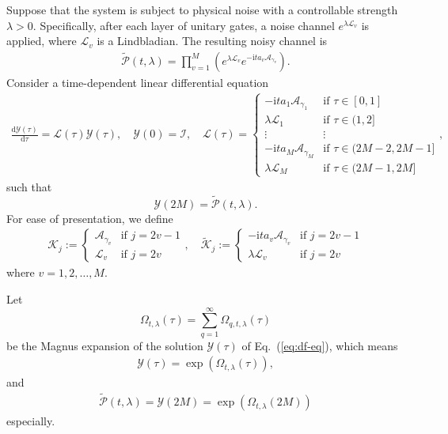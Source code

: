 \documentclass[11pt]{article}
\newcommand{\eq}[1]{(\ref{eq:#1})}
\renewcommand{\i}{\mathrm{i}}
\renewcommand{\d}{\mathrm{d}}
\renewcommand{\P}{\mathcal{P}}
\newcommand{\A}{\mathcal{A}}
\newcommand{\mc}{\mathcal}
\begin{document}
Suppose that the system is subject to physical noise with a controllable strength $\lambda>0$. Specifically, after each layer of unitary gates, a noise channel $e^{\lambda \mc L_{v}}$ is applied, where $\mc L_{v}$ is a Lindbladian. The resulting noisy channel is
\begin{align*}
    \tilde{\P}(t,\lambda)=\prod_{v=1}^M\left( e^{\lambda \mc L_{v}} e^{-\i t a_{v} \A_{\gamma_v}} \right).
\end{align*}
Consider a time-dependent linear differential equation \begin{align}
   \frac{\d \mc Y(\tau)}{\d \tau} = \mc L(\tau) \mc Y(\tau), \quad \mc Y(0)= \mc I, \quad \mc L(\tau) = \begin{cases} -\i t a_1 \A_{\gamma_1} & \text{if } \tau \in [0, 1] \\ \lambda \mc L_1 & \text{if } \tau \in (1, 2] \\ \vdots & \vdots \\ -\i t a_M \A_{\gamma_M} & \text{if } \tau \in (2M-2, 2M-1] \\ \lambda \mc L_M & \text{if } \tau \in (2M-1, 2M] \end{cases}, \label{eq:df-eq}
\end{align}
such that \[
\mc Y(2M) = \tilde{\mc P}(t, \lambda).
\]
For ease of presentation, we define \begin{align}
    \mathcal{K}_j := \begin{cases}\mathcal{A}_{\gamma_v} & \text{if } j = 2v-1\\ \mathcal{L}_v & \text{if } j = 2v \end{cases}, \quad \tilde{\mathcal{K}}_j := \begin{cases}-\i ta_{v}\mathcal{A}_{\gamma_v} & \text{if } j = 2v-1\\ \lambda\mathcal{L}_v & \text{if } j = 2v \end{cases} \label{eq:def-K}
\end{align}
where $v = 1, 2,\ldots, M$.

Let 
\[ \Omega_{t,\lambda}(\tau) = \sum_{q=1}^{\infty}\Omega_{q,t,\lambda}(\tau)\]
be the Magnus expansion of the solution $\mc Y(\tau)$ of Eq.~\eq{df-eq}, which means \begin{align*}
    \mc Y(\tau) = \exp(\Omega_{t,\lambda}(\tau)),
\end{align*} and \begin{align*}
    \tilde{\mc P}(t,\lambda) =\mc Y(2M)= \exp(\Omega_{t,\lambda}(2M))
\end{align*} especially. 
\end{document}
